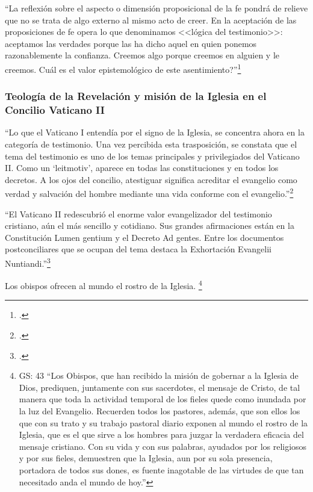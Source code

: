 \documentclass[12pt]{article}
\begin{document}
``La reflexión sobre el aspecto o dimensión proposicional de la fe pondrá de relieve que no se trata de algo externo al mismo acto de creer. En la aceptación de las proposiciones de fe opera lo que denominamos <<lógica del testimonio>>: aceptamos las verdades porque las ha dicho aquel en quien ponemos razonablemente la confianza. Creemos algo porque creemos en alguien y le creemos. \textquestiondown Cuál es el valor epistemológico de este asentimiento?''\footcite[p.483]{feylogicaconesa}

\subsubsection{Teología de la Revelación y misión de la Iglesia en el Concilio Vaticano II}

``Lo que el Vaticano I entendía por el signo de la Iglesia, se concentra ahora en la categoría de testimonio. Una vez percibida esta trasposición, se constata que el tema del testimonio es uno de los temas principales y privilegiados del Vaticano II. Como un `leitmotiv', aparece en todas las constituciones y en todos los decretos. A los ojos del concilio, atestiguar significa acreditar el evangelio como verdad y salvación del hombre mediante una vida conforme con el evangelio.''\footcite[p.~1532]{dicctf}

``El Vaticano II redescubrió el enorme valor evangelizador del testimonio cristiano, aún el más sencillo y cotidiano. Sus grandes afirmaciones están en la Constitución Lumen gentium y el Decreto Ad gentes. Entre los documentos postconciliares que se ocupan del tema destaca la Exhortación Evangelii Nuntiandi.''\footcite[pp.~378--379]{ftcpellitero}

Los obispos ofrecen al mundo el rostro de la Iglesia.
\footnote{
GS: 43
``Los Obispos, que han recibido la misión de gobernar a la Iglesia de Dios, prediquen, juntamente con sus sacerdotes, el mensaje de Cristo, de tal manera que toda la actividad temporal de los fieles quede como inundada por la luz del Evangelio. Recuerden todos los pastores, además, que son ellos los que con su trato y su trabajo pastoral diario exponen al mundo el rostro de la Iglesia, que es el que sirve a los hombres para juzgar la verdadera eficacia del mensaje cristiano. Con su vida y con sus palabras, ayudados por los religiosos y por sus fieles, demuestren que la Iglesia, aun por su sola presencia, portadora de todos sus dones, es fuente inagotable de las virtudes de que tan necesitado anda el mundo de hoy.''
}
\end{document}
